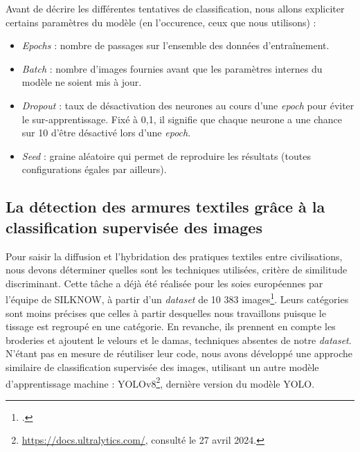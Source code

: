 Avant de décrire les différentes tentatives de classification, nous allons expliciter certains paramètres du modèle (en l'occurence, ceux que nous utilisons) : 
\begin{itemize}
	\item \textit{Epochs} : nombre de passages sur l'ensemble des données d'entraînement.
	\item \textit{Batch} : nombre d'images fournies avant que les paramètres internes du modèle ne soient mis à jour.
	\item \textit{Dropout} : taux de désactivation des neurones au cours d'une \textit{epoch} pour éviter le sur-apprentissage. Fixé à 0,1, il signifie que chaque neurone a une chance sur 10 d'être désactivé lors d'une \textit{epoch}.
	\item \textit{Seed} : graine aléatoire qui permet de reproduire les résultats (toutes configurations égales par ailleurs).
\end{itemize}

\subsection{La détection des armures textiles grâce à la classification supervisée des images}
Pour saisir la diffusion et l'hybridation des pratiques textiles entre civilisations, nous devons déterminer quelles sont les techniques utilisées, critère de similitude discriminant. Cette tâche a déjà été réalisée pour les soies européennes par l'équipe de SILKNOW, à partir d'un \textit{dataset} de 10 383 images\footcite[p.~51]{dorozynskiMultiTaskDeepLearning2019}. Leurs catégories sont moins précises que celles à partir desquelles nous travaillons puisque le tissage est regroupé en une catégorie. En revanche, ils prennent en compte les broderies et ajoutent le velours et le damas, techniques absentes de notre \textit{dataset}. N'étant pas en mesure de réutiliser leur code, nous avons développé une approche similaire de classification supervisée des images, utilisant un autre modèle d'apprentissage machine : YOLOv8\footnote{\url{https://docs.ultralytics.com/}, consulté le 27 avril 2024.}, dernière version du modèle YOLO.

